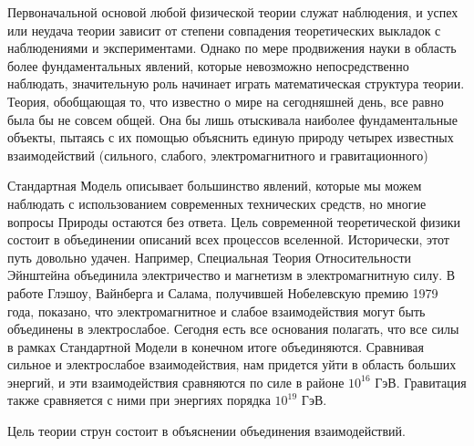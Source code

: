 Первоначальной основой любой физической теории служат наблюдения,
и успех или неудача теории зависит от степени совпадения
теоретических выкладок с наблюдениями и экспериментами.
Однако по мере продвижения науки в область более фундаментальных явлений,
которые невозможно непосредственно наблюдать,
значительную роль начинает играть математическая структура теории.
Теория, обобщающая то, что известно о мире на сегодняшней день,
все равно была бы не совсем общей. Она бы лишь отыскивала наиболее фундаментальные объекты,
пытаясь с их помощью  объяснить единую природу четырех известных взаимодействий (сильного, слабого, электромагнитного и гравитационного)

Стандартная Модель описывает большинство явлений,
которые мы можем наблюдать с использованием современных технических средств,
но многие вопросы Природы остаются без ответа.
Цель современной теоретической физики состоит в объединении описаний всех процессов вселенной.
Исторически, этот путь довольно удачен. Например,
Специальная Теория Относительности Эйнштейна объединила электричество и магнетизм в электромагнитную силу.
В работе Глэшоу, Вайнберга и Салама, получившей Нобелевскую премию 1979 года, показано,
что электромагнитное и слабое взаимодействия могут быть объединены в электрослабое.
Сегодня есть все основания полагать, что все силы в рамках Стандартной Модели в конечном итоге объединяются.
Сравнивая сильное и электрослабое взаимодействия, нам придется уйти в область больших энергий,
и эти взаимодействия  сравняются по силе в районе $10^16$ ГэВ.
Гравитация также сравняется с ними при энергиях порядка $10^{19}$ ГэВ. 

Цель теории струн состоит в объяснении объединения взаимодействий.